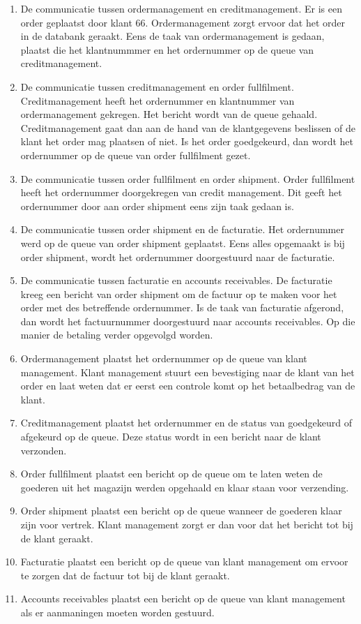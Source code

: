 \begin{enumerate}
	\item De communicatie tussen ordermanagement en creditmanagement. Er is een order geplaatst door klant 66. Ordermanagement zorgt ervoor dat het order in de databank geraakt. Eens de taak van ordermanagement is gedaan, plaatst die het klantnummmer en het ordernummer op de queue van creditmanagement. 
	\item De communicatie tussen creditmanagement en order fullfilment. Creditmanagement heeft het ordernummer en klantnummer van ordermanagement gekregen. Het bericht wordt van de queue gehaald. Creditmanagement gaat dan aan de hand van de klantgegevens beslissen of de klant het order mag plaatsen of niet. Is het order goedgekeurd, dan wordt het ordernummer op de queue van order fullfilment gezet.
	\item De communicatie tussen order fullfilment en order shipment. Order fullfilment heeft het ordernummer doorgekregen van credit management. Dit geeft het ordernummer door aan order shipment eens zijn taak gedaan is. 
	\item De communicatie tussen order shipment en de facturatie. Het ordernummer werd op de queue van order shipment geplaatst. Eens alles opgemaakt is bij order shipment, wordt het ordernummer doorgestuurd naar de facturatie.
	\item De communicatie tussen facturatie en accounts receivables. De facturatie kreeg een bericht van order shipment om de factuur op te maken voor het order met des betreffende ordernummer. Is de taak van facturatie afgerond, dan wordt het factuurnummer doorgestuurd naar accounts receivables. Op die manier de betaling verder opgevolgd worden.
	\item Ordermanagement plaatst het ordernummer op de queue van klant management. Klant management stuurt een bevestiging naar de klant van het order en laat weten dat er eerst een controle komt op het betaalbedrag van de klant.
	\item Creditmanagement plaatst het ordernummer en de status van goedgekeurd of afgekeurd op de queue. Deze status wordt in een bericht naar de klant verzonden. 
	\item Order fullfilment plaatst een bericht op de queue om te laten weten de goederen uit het magazijn werden opgehaald en klaar staan voor verzending.
	\item Order shipment plaatst een bericht op de queue wanneer de goederen klaar zijn voor vertrek. Klant management zorgt er dan voor dat het bericht tot bij de klant geraakt.
	\item Facturatie plaatst een bericht op de queue van klant management om ervoor te zorgen dat de factuur tot bij de klant geraakt.
	\item Accounts receivables plaatst een bericht op de queue van klant management als er aanmaningen moeten worden gestuurd.
\end{enumerate}


